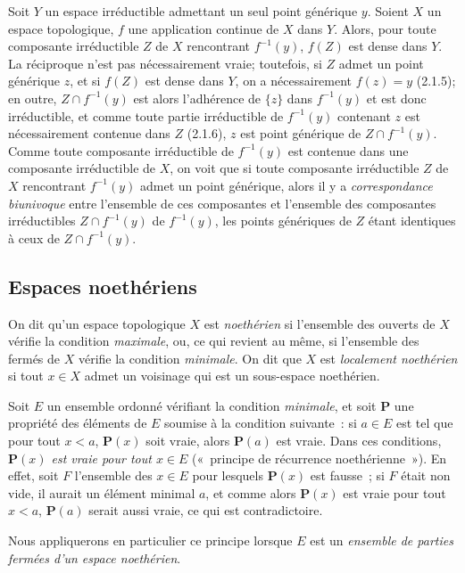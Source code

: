 \begin{env}[2.1.8]
\label{0.2.1.8-fr}
Soit $Y$ un espace irréductible admettant un seul point générique $y$. Soient
$X$ un espace topologique, $f$ une application continue de $X$ dans $Y$.
Alors, pour toute composante irréductible $Z$ de $X$ rencontrant $f^{-1}(y)$,
$f(Z)$ est dense dans $Y$. La réciproque n'est pas nécessairement vraie;
toutefois, si $Z$ admet un point générique $z$, et si $f(Z)$ est dense dans
$Y$, on a nécessairement $f(z)=y$ (2.1.5); en outre, $Z\cap f^{-1}(y)$ est
alors l'adhérence de $\{z\}$ dans $f^{-1}(y)$ et est donc irréductible, et
comme toute partie irréductible de $f^{-1}(y)$ contenant $z$ est
nécessairement contenue dans $Z$ (2.1.6), $z$ est point générique de
$Z\cap f^{-1}(y)$. Comme toute composante irréductible de $f^{-1}(y)$ est
contenue dans une composante irréductible de $X$, on voit que si toute
composante irréductible $Z$ de $X$ rencontrant $f^{-1}(y)$ admet un point
générique, alors il y a \emph{correspondance biunivoque} entre l'ensemble de
ces composantes et l'ensemble des composantes irréductibles
$Z\cap f^{-1}(y)$ de $f^{-1}(y)$, les points génériques de $Z$ étant
identiques à ceux de $Z\cap f^{-1}(y)$.
\end{env}


\subsection{Espaces noethériens}
\label{subsection:0.2.2-fr}

\begin{env}[2.2.1]
\label{0.2.2.1-fr}
On dit qu'un espace topologique $X$ est \emph{noethérien} si l'ensemble des
ouverts de $X$ vérifie la condition \emph{maximale}, ou, ce qui revient au
même, si l'ensemble des fermés de $X$ vérifie la condition \emph{minimale}. On
dit que $X$ est \emph{localement noethérien} si tout $x\in X$ admet un
voisinage qui est un sous-espace noethérien.
\end{env}

\begin{env}[2.2.2]
\label{0.2.2.2-fr}
Soit $E$ un ensemble ordonné vérifiant la condition \emph{minimale}, et soit
$\boldsymbol{P}$ une propriété des éléments de $E$ soumise à la condition suivante~: si
$a\in E$ est tel que pour tout $x<a$, $\boldsymbol{P}(x)$ soit vraie, alors $\boldsymbol{P}(a)$ est
vraie. Dans ces conditions, \emph{$\boldsymbol{P}(x)$ est vraie pour tout $x\in E$}
(«~principe de récurrence noethérienne~»). En effet, soit $F$ l'ensemble des
$x\in E$ pour lesquels $\boldsymbol{P}(x)$ est fausse~; si $F$ était non vide, il aurait un
élément minimal $a$, et comme alors $\boldsymbol{P}(x)$ est vraie pour tout $x<a$, $\boldsymbol{P}(a)$
serait aussi vraie, ce qui est contradictoire.

Nous appliquerons en particulier ce principe lorsque $E$ est un \emph{ensemble
de parties fermées d'un espace noethérien}.
\end{env}

